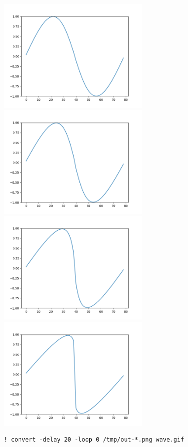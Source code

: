 \documentclass[12pt,fleqn]{article}\usepackage{../../common}
\begin{document}
\includegraphics[width=20em]{out-005.png}
\includegraphics[width=20em]{out-010.png}
\includegraphics[width=20em]{out-020.png}
\includegraphics[width=20em]{out-030.png}

\begin{verbatim}
! convert -delay 20 -loop 0 /tmp/out-*.png wave.gif
\end{verbatim}
\end{document}
